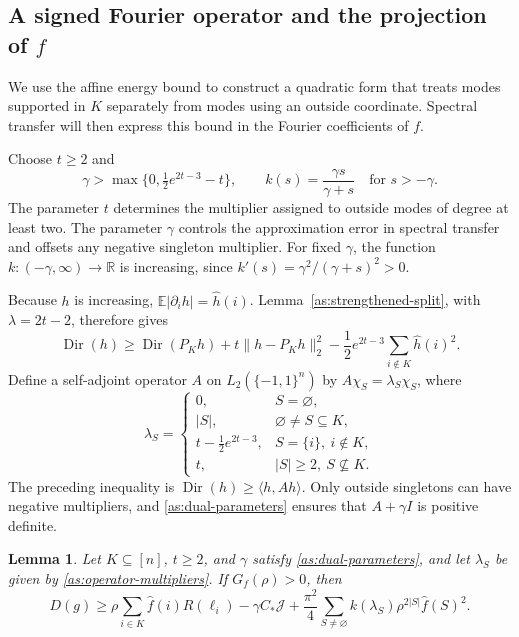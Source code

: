 \documentclass[11pt,letterpaper]{amsart}
\newcommand{\E}{\mathbb E}
\newcommand{\R}{\mathbb R}
\newcommand{\1}{\mathbf 1}
\newtheorem{lemma}[theorem]{Lemma}
\numberwithin{equation}{section}
\begin{document}
\subsection{A signed Fourier operator and the projection of \texorpdfstring{$f$}{f}}

We use the affine energy bound to construct a quadratic form
that treats modes supported in $K$ separately from modes using
an outside coordinate.
Spectral transfer will then express this bound in the Fourier
coefficients of $f$.

Choose $t\ge2$ and
\begin{equation}\label{as:dual-parameters}
 \gamma>\max\{0,\tfrac12e^{2t-3}-t\},
 \qquad
 k(s)=\frac{\gamma s}{\gamma+s}
 \quad \text{for } s>-\gamma.
\end{equation}
The parameter $t$ determines the multiplier assigned to outside
modes of degree at least two.
The parameter $\gamma$ controls the approximation error in
spectral transfer and offsets any negative singleton multiplier.
For fixed $\gamma$, the function
$k:(-\gamma,\infty)\to\R$ is increasing, since
$k'(s)=\gamma^2/(\gamma+s)^2>0$.

Because $h$ is increasing,
$\E|\partial_i h|=\widehat h(i)$.
Lemma~\ref{as:strengthened-split}, with $\lambda=2t-2$,
therefore gives
\[
 \operatorname{Dir}(h)
 \ge\operatorname{Dir}(P_Kh)
   +t\|h-P_Kh\|_2^2
   -\frac12e^{2t-3}\sum_{i\notin K}\widehat h(i)^2.
\]
Define a self-adjoint operator $A$ on
$L_2(\{-1,1\}^n)$ by $A\chi_S=\lambda_S\chi_S$, where
\begin{equation}\label{as:operator-multipliers}
 \lambda_S=
 \begin{cases}
 0,&S=\varnothing,\\
 |S|,&\varnothing\ne S\subseteq K,\\
 t-\tfrac12e^{2t-3},&S=\{i\},\ i\notin K,\\
 t,&|S|\ge2,\ S\not\subseteq K.
 \end{cases}
\end{equation}
The preceding inequality is
$\operatorname{Dir}(h)\ge\langle h,Ah\rangle$.
Only outside singletons can have negative multipliers,
and \eqref{as:dual-parameters} ensures that $A+\gamma I$
is positive definite.

\begin{lemma}\label{as:spectral-line}
Let $K\subseteq[n]$, $t\ge2$, and $\gamma$ satisfy
\eqref{as:dual-parameters}, and let $\lambda_S$ be given by
\eqref{as:operator-multipliers}.
If $G_f(\rho)>0$, then
\[
 D(g)\ge
 \rho\sum_{i\in K}\widehat f(i)R(\ell_i)
 -\gamma C_*\mathcal J
 +\frac{\pi^2}{4}
   \sum_{S\ne\varnothing}
       k(\lambda_S)\rho^{2|S|}\widehat f(S)^2.
\]
\end{lemma}
\end{document}
